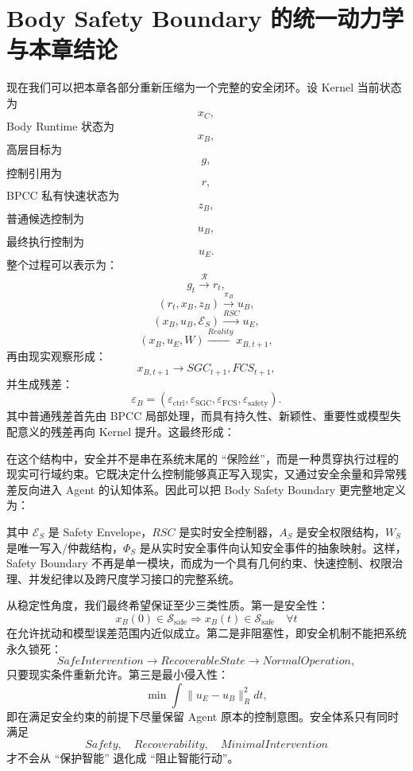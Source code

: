 \section{Body Safety Boundary 的统一动力学与本章结论}

现在我们可以把本章各部分重新压缩为一个完整的安全闭环。设 Kernel 当前状态为
\[
x_C,
\]
Body Runtime 状态为
\[
x_B,
\]
高层目标为
\[
g,
\]
控制引用为
\[
r,
\]
BPCC 私有快速状态为
\[
z_B,
\]
普通候选控制为
\[
u_B,
\]
最终执行控制为
\[
u_E.
\]
整个过程可以表示为：
\[
g_t
\overset{\mathcal R}{\longrightarrow}
r_t,
\]
\[
(r_t,x_B,z_B)
\overset{\pi_B}{\longrightarrow}
u_B,
\]
\[
(x_B,u_B,\mathcal E_S)
\overset{RSC}{\longrightarrow}
u_E,
\]
\[
(x_B,u_E,W)
\overset{Reality}{\longrightarrow}
x_{B,t+1},
\]
再由现实观察形成：
\[
x_{B,t+1}
\rightarrow
SGC_{t+1},FCS_{t+1},
\]
并生成残差：
\[
\varepsilon_B
=
(
\varepsilon_{\mathrm{ctrl}},
\varepsilon_{\mathrm{SGC}},
\varepsilon_{\mathrm{FCS}},
\varepsilon_{\mathrm{safety}}
).
\]
其中普通残差首先由 BPCC 局部处理，而具有持久性、新颖性、重要性或模型失配意义的残差再向 Kernel 提升。这最终形成：
\begin{statementbox}
\centering
{}
\end{statementbox}

在这个结构中，安全并不是串在系统末尾的 ``保险丝''，而是一种贯穿执行过程的现实可行域约束。它既决定什么控制能够真正写入现实，又通过安全余量和异常残差反向进入 Agent 的认知体系。因此可以把 Body Safety Boundary 更完整地定义为：
\begin{statementbox}
\centering
{}
\end{statementbox}
其中 $\mathcal E_S$ 是 Safety Envelope，$RSC$ 是实时安全控制器，$A_S$ 是安全权限结构，$W_S$ 是唯一写入/仲裁结构，$\Phi_S$ 是从实时安全事件向认知安全事件的抽象映射。这样，Safety Boundary 不再是单一模块，而成为一个具有几何约束、快速控制、权限治理、并发纪律以及跨尺度学习接口的完整系统。

从稳定性角度，我们最终希望保证至少三类性质。第一是安全性：
\[
x_B(0)\in\mathcal S_{\mathrm{safe}}
\Rightarrow
x_B(t)\in\mathcal S_{\mathrm{safe}}
\quad
\forall t
\]
在允许扰动和模型误差范围内近似成立。第二是非阻塞性，即安全机制不能把系统永久锁死：
\[
SafeIntervention
\rightarrow
RecoverableState
\rightarrow
NormalOperation,
\]
只要现实条件重新允许。第三是最小侵入性：
\[
\min
\int
\|u_E-u_B\|_R^2dt,
\]
即在满足安全约束的前提下尽量保留 Agent 原本的控制意图。安全体系只有同时满足
\[
Safety,\quad Recoverability,\quad MinimalIntervention
\]
才不会从 ``保护智能'' 退化成 ``阻止智能行动''。

